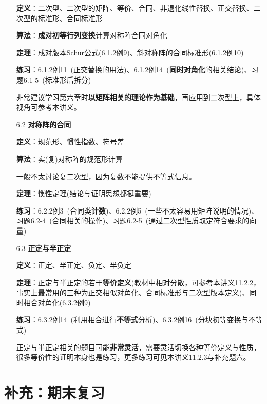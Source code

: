 \documentclass[a4paper,UTF8,fontset=windows]{ctexart}
\newcommand*{\note}{\noindent *}
\begin{document}
\begin{enumerate}
    \textbf{定义}：二次型、二次型的矩阵、等价、合同、非退化线性替换、正交替换、二次型的标准形、合同标准形

    \textbf{算法}：\textbf{成对初等行列变换}计算对称阵合同对角化
    
    \textbf{定理}：成对版本Schur公式(6.1.2例9)、斜对称阵的合同标准形(6.1.2例10)

    \textbf{练习}：6.1.2例11\ (正交替换的用法)、6.1.2例14\ (\textbf{同时对角化}的相关结论)、习题6.1-5\ (标准形后拆分)

    \note 非常建议学习第六章时\textbf{以矩阵相关的理论作为基础}，再应用到二次型上，具体视角可参考本讲义。

    \item[6.2] \textbf{对称阵的合同}
    
    \textbf{定义}：规范形、惯性指数、符号差

    \textbf{算法}：实(复)对称阵的规范形计算

    \note 一般不太讨论复二次型，因为复数不能提供不等式信息。

    \textbf{定理}：惯性定理(结论与证明思想都挺重要)

    \textbf{练习}：6.2.2例3\ (合同类\textbf{计数})、6.2.2例5\ (一些不太容易用矩阵说明的情况)、习题6.2-4\ (合同相关的操作)、习题6.2-5\ (通过二次型性质取定符合要求的向量)

    \item[6.3] \textbf{正定与半正定}
    
    \textbf{定义}：正定、半正定、负定、半负定

    \textbf{定理}：正定与半正定的若干\textbf{等价定义}(教材中相对分散，可参考本讲义11.2.2，事实上最常用的三种为正交相似对角化、合同标准形与二次型版本定义)、同时相合对角化(6.3.2例9)

    \textbf{练习}：6.3.2例14\ (利用相合进行\textbf{不等式}分析)、6.3.2例16\ (分块初等变换与不等式)

    \note 正定与半正定相关的题目可能\textbf{非常灵活}，需要灵活切换各种等价定义与性质，很多等价性的证明本身也是练习，更多练习可见本讲义11.2.3与补充题六。
\end{enumerate}

\section{补充：期末复习}
\end{document}
